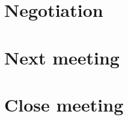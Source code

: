 \documentclass[11pt, a4paper]{article}
\begin{document}
\section{Negotiation}


\section{Next meeting}

\section {Close meeting}
\vspace*{10pt}
\end{document}
